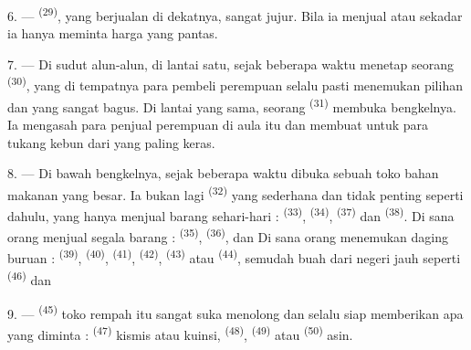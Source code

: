 \VUsaut{4.0mm}
\VUsaut{3.0mm}

6. ---  \textsuperscript{(29)}, yang
berjualan di dekatnya, sangat jujur. Bila ia menjual 
  atau sekadar  ia hanya
meminta harga yang pantas.

7. --- Di sudut alun-alun, di lantai satu, sejak beberapa waktu
menetap seorang  \textsuperscript{(30)}, yang di
tempatnya para pembeli perempuan selalu pasti menemukan pilihan
   dan 
yang sangat bagus. Di lantai yang sama, seorang 
\textsuperscript{(31)} membuka bengkelnya. Ia mengasah 
para penjual perempuan di aula itu dan membuat untuk para tukang kebun
 dari  yang paling keras.

\VUsaut{4.0mm}
\VUsaut{3.0mm}

8. --- Di bawah bengkelnya, sejak beberapa waktu dibuka sebuah toko
bahan makanan yang besar. Ia bukan lagi 
\textsuperscript{(32)} yang sederhana dan tidak penting seperti dahulu,
yang hanya menjual barang sehari-hari : 
\textsuperscript{(33)},  \textsuperscript{(34)},
 \textsuperscript{(37)} dan 
\textsuperscript{(38)}. Di sana orang menjual segala barang :
 
\textsuperscript{(35)}, 
\textsuperscript{(36)},  
  dan  Di sana
orang menemukan daging buruan : 
\textsuperscript{(39)},  \textsuperscript{(40)},
 \textsuperscript{(41)}, 
\textsuperscript{(42)},  \textsuperscript{(43)} atau
 \textsuperscript{(44)}, semudah buah dari negeri
jauh seperti  \textsuperscript{(46)} dan 

9. ---  \textsuperscript{(45)} toko rempah itu sangat
suka menolong dan selalu siap memberikan apa yang diminta :
 \textsuperscript{(47)} kismis atau kuinsi,
 \textsuperscript{(48)}, 
\textsuperscript{(49)} atau  \textsuperscript{(50)}
asin.

